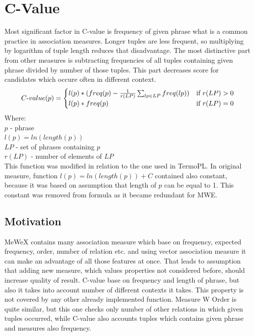 \section{C-Value}
Most significant factor in C-value is frequency of given phrase what is a common practice in association measures. 
Longer tuples are less frequent, so multiplying by logarithm of tuple length reduces that disadvantage. 
The most distinctive part from other measures is subtracting frequencies of all tuples containing given phrase divided by number of those tuples. 
This part decreases score for candidates which occure often in different context.
\[ 
    C{\text -}value(p) = \begin{cases}
        l(p) * (freq(p) - \frac{1}{r(LP)}\sum_{lp \in LP}{freq(lp)}) & \text{if } r(LP) > 0\\
        l(p) * freq(p)            & \text{if } r(LP) = 0\\
    \end{cases}
\]
Where: \\
\(p\)  - phrase \\
\(l(p) = ln(length(p))\) \\
\(LP\)  - set of phrases containing \(p\) \\
\(r(LP)\) - number of elements of \(LP\) \\

This function was modified in relation to the one used in TermoPL. In original measure, function \(l(p) = ln(length(p)) + C\) 
contained also constant, because it was based on assumption that length of \(p\) can be equal to 1. This constant was removed 
from formula as it became redundant for MWE.

\subsection{Motivation}
MeWeX contains many association measure which base on frequency, expected frequency, order, number of relation etc. 
and using vector association measure it can make an advantage of all those features at once. That leads to assumption that adding new measure, 
which values properties not considered before, should increase quality of result. C-value base on frequency and length of phrase, 
but also it takes into account number of different contexts it takes. This property is not covered by any other already implemented function.
Measure W Order is quite similar, but this one checks only number of other relations in which given tuples occurred, 
while C-value also accounts tuples which contains given phrase and measures also frequency.


